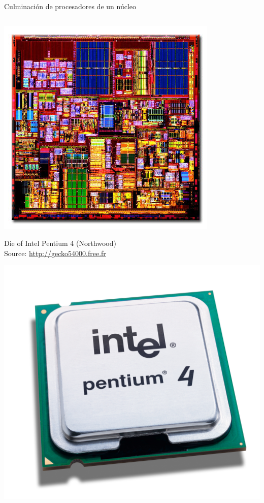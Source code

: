 \begin{frame}[t,shrink=15]{Culminación de procesadores de un núcleo}
\begin{columns}
  \begin{column}{.15\textwidth}
    \includegraphics[width=\textwidth]{images/intel-p4-die.jpg}\\
    \begin{tiny}
      Die of Intel Pentium 4 (Northwood)\\
      Source: \url{http://gecko54000.free.fr}\\
    \end{tiny}
    \vspace{0.75em}
    \begin{center}
      \includegraphics[width=.9\textwidth]{images/intel-p4.jpg}\\

\end{center}
\end{column}
\end{columns}
\end{frame}
